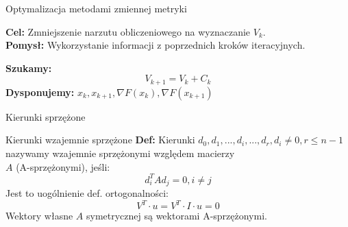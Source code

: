   \begin{frame}{Optymalizacja metodami zmiennej metryki}
    \begin{block}{}
      \textbf{Cel: } Zmniejszenie narzutu obliczeniowego na wyznaczanie $V_k$.\\
      \textbf{Pomysł: } Wykorzystanie informacji z poprzednich kroków iteracyjnych.
    \end{block}

    \begin{block}{}
      \textbf{Szukamy: }
        \begin{equation}\label{eq:v_k_c}
          V_{k + 1} = V_k + C_k
        \end{equation}
      \textbf{Dysponujemy: } $x_k, x_{k + 1}, \nabla F(x_k), \nabla F(x_{k + 1})$
    \end{block}
  \end{frame}

  \begin{frame}{Kierunki sprzężone}
    \begin{block}{Kierunki wzajemnie sprzężone}
      \textbf{Def: } Kierunki $d_0, d_1, ..., d_i, ..., d_r, d_i \neq 0, r \leq n - 1$\\
      nazywamy wzajemnie sprzężonymi względem macierzy\\
      $A$ (A-sprzężonymi), jeśli:
      \begin{equation*}
        d_i^T A d_j = 0, i \neq j
      \end{equation*}
      Jest to uogólnienie def. ortogonalności:
      \begin{equation*}
        V^T \cdot u = V^T \cdot I \cdot u = 0
      \end{equation*}
      Wektory własne $A$ symetrycznej są wektorami A-sprzężonymi.
    \end{block}
  \end{frame}

